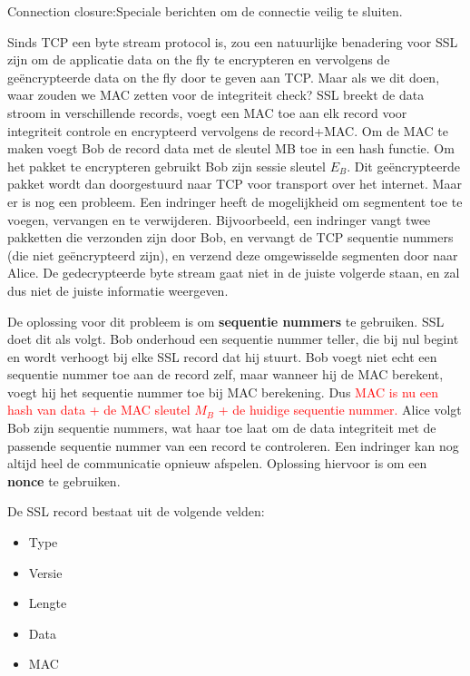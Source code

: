 \fra  Connection closure:Speciale berichten om de connectie veilig te sluiten.

\noindent Sinds TCP een byte stream protocol is, zou een natuurlijke benadering voor SSL zijn om de applicatie data on the fly te encrypteren en vervolgens de geëncrypteerde data on the fly door te geven aan TCP. Maar als we dit doen, waar zouden we MAC zetten voor de integriteit check?
SSL breekt de data stroom in verschillende records, voegt een MAC toe aan elk record voor integriteit controle en encrypteerd vervolgens de record+MAC. Om de MAC te maken voegt Bob de record data met de sleutel MB toe in een hash functie. Om het pakket te encrypteren gebruikt Bob zijn sessie sleutel $E_B$. Dit geëncrypteerde pakket wordt dan doorgestuurd naar TCP voor transport over het internet.
Maar er is nog een probleem. Een indringer heeft de mogelijkheid om segmentent toe te voegen, vervangen en te verwijderen. Bijvoorbeeld, een indringer vangt twee pakketten die verzonden zijn door Bob, en vervangt de TCP sequentie nummers (die niet geëncrypteerd zijn), en verzend deze omgewisselde segmenten door naar Alice.
De gedecrypteerde byte stream gaat niet in de juiste volgerde staan, en zal dus niet de juiste informatie weergeven.

\noindent De oplossing voor dit probleem is om \textbf{sequentie nummers} te gebruiken. SSL doet dit als volgt. Bob onderhoud een sequentie nummer teller, die bij nul begint en wordt verhoogt bij elke SSL record dat hij stuurt. Bob voegt niet echt een sequentie nummer toe aan de record zelf, maar wanneer hij de MAC berekent, voegt hij het sequentie nummer toe bij MAC berekening. Dus \textcolor{red}{MAC is nu een hash van data + de MAC sleutel $M_B$ + de huidige sequentie nummer.}
Alice volgt Bob zijn sequentie nummers, wat haar toe laat om de data integriteit met de passende sequentie nummer van een record te controleren.
Een indringer kan nog altijd heel de communicatie opnieuw afspelen. Oplossing hiervoor is om een \textbf{nonce} te gebruiken.

\clearpage


De SSL record bestaat uit de volgende velden:
\begin{itemize}

\item Type
\item Versie
\item Lengte
\item Data
\item MAC
\end{itemize}


